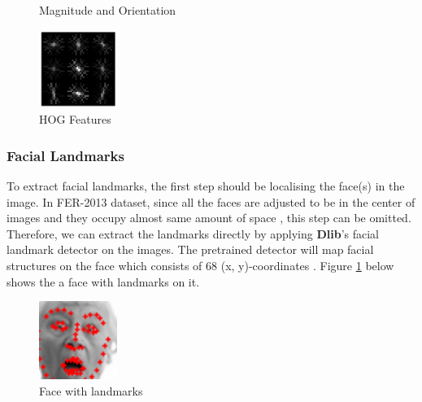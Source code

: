 \documentclass{article}
\begin{document}
\begin{figure}[H] 
    \centering
    \hspace*{.4in}
    \caption{Magnitude and Orientation}
\end{figure}

\begin{figure}[H]
    \centering
    \includegraphics[height=1in]{HOG figures/hog.png}
    \caption{HOG Features}
\end{figure}

\subsubsection{Facial Landmarks}
To extract facial landmarks, the first step should be localising the face(s) in the image. In FER-2013 dataset, since all the faces are adjusted to be in the center of images and they occupy almost same amount of space \cite{jumani2019facial}, this step can be omitted. Therefore, we can extract the landmarks  directly by applying \textbf{Dlib}'s facial landmark detector on the images. The pretrained detector will map facial structures on the face which consists of 68 (x, y)-coordinates \cite{8696059}. Figure \ref{dlib} below shows the a face with landmarks on it.

\begin{figure}[H]
    \centering
    \includegraphics[height=1in]{figures/dlib.png}
    \caption{Face with landmarks}
    \label{dlib}
\end{figure}
\end{document}
